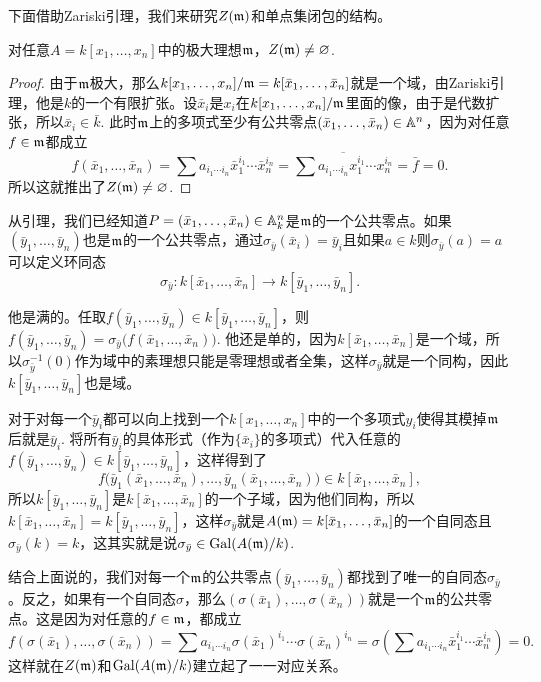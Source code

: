 下面借助Zariski引理，我们来研究$Z(\mathfrak{m})$和单点集闭包的结构。

\begin{lem}
    对任意$A=k[x_1,\dots,x_n]$中的极大理想$\mathfrak{m}$，$Z(\mathfrak{m})\neq\varnothing$.
\end{lem}

\begin{proof} 由于$\mathfrak{m}$极大，那么$k[x_1,\dots,x_n]/\mathfrak{m}=k[\bar{x}_1,\dots,\bar{x}_n]$就是一个域，由Zariski引理，他是$k$的一个有限扩张。设$\bar{x}_i$是$x_i$在$k[x_1,\dots,x_n]/\mathfrak{m}$里面的像，由于是代数扩张，所以$\bar{x}_i\in \bar{k}$. 此时$\mathfrak{m}$上的多项式至少有公共零点$(\bar{x}_1,\dots,\bar{x}_n)\in \mathbb{A}^n$，因为对任意$f\in \mathfrak{m}$都成立
    \[
        f(\bar{x}_1,\dots,\bar{x}_n)=\sum a_{i_1\cdots i_n} {\bar{x}}_1^{i_1}\cdots {\bar{x}}_n^{i_n}=\overline{\sum a_{i_1\cdots i_n} x_1^{i_1}\cdots x_n^{i_n}}=\bar{f}=0.
    \]
    所以这就推出了$Z(\mathfrak{m})\neq\varnothing$.\end{proof}

从引理，我们已经知道$P=(\bar{x}_1,\dots,\bar{x}_n)\in \mathbb{A}^n_k$是$\mathfrak{m}$的一个公共零点。如果$(\bar{y}_1,\dots,\bar{y}_n)$也是$\mathfrak{m}$的一个公共零点，通过$\sigma_{\bar{y}}(\bar{x}_i)=\bar{y}_i$且如果$a\in k$则$\sigma_{\bar{y}}(a)=a$可以定义环同态
\[
    \sigma_{\bar{y}}:k[\bar{x}_1,\dots,\bar{x}_n]\to k[\bar{y}_1,\dots,\bar{y}_n].
\]

他是满的。任取$f(\bar{y}_1,\dots,\bar{y}_n)\in k[\bar{y}_1,\dots,\bar{y}_n]$，则$f(\bar{y}_1,\dots,\bar{y}_n)=\sigma_{\bar{y}}\bigl(f(\bar{x}_1,\dots,\bar{x}_n)\bigr)$.
他还是单的，因为$k[\bar{x}_1,\dots,\bar{x}_n]$是一个域，所以$\sigma_{\bar{y}}^{-1}(0)$作为域中的素理想只能是零理想或者全集，这样$\sigma_{\bar{y}}$就是一个同构，因此$k[\bar{y}_1,\dots,\bar{y}_n]$也是域。

对于对每一个$\bar{y}_i$都可以向上找到一个$k[x_1,\dots,x_n]$中的一个多项式$y_i$使得其模掉$\mathfrak{m}$后就是$\bar{y}_i$.
将所有$\bar{y}_i$的具体形式（作为$\{\bar{x}_i\}$的多项式）代入任意的$f(\bar{y}_1,\dots,\bar{y}_n) \in k[\bar{y}_1,\dots,\bar{y}_n]$，这样得到了
\[
    f\bigl(\bar{y}_1(\bar{x}_1,\dots,\bar{x}_n),\dots,\bar{y}_n(\bar{x}_1,\dots,\bar{x}_n)\bigr) \in k[\bar{x}_1,\dots,\bar{x}_n],
\]
所以$k[\bar{y}_1,\dots,\bar{y}_n]$是$k[\bar{x}_1,\dots,\bar{x}_n]$的一个子域，因为他们同构，所以$k[\bar{x}_1,\dots,\bar{x}_n]=k[\bar{y}_1,\dots,\bar{y}_n]$，这样$\sigma_{\bar{y}}$就是$A(\mathfrak{m})=k[\bar{x}_1,\dots,\bar{x}_n]$的一个自同态且$\sigma_{\bar{y}}(k)=k$，这其实就是说$\sigma_{\bar{y}}\in \operatorname{Gal}(A(\mathfrak{m})/k)$.

结合上面说的，我们对每一个$\mathfrak{m}$的公共零点$(\bar{y}_1,\dots,\bar{y}_n)$都找到了唯一的自同态$\sigma_{\bar{y}}$。反之，如果有一个自同态$\sigma$，那么$(\sigma(\bar{x}_1),\dots,\sigma(\bar{x}_n))$就是一个$\mathfrak{m}$的公共零点。这是因为对任意的$f\in\mathfrak{m}$，都成立
\[
    f(\sigma(\bar{x}_1),\dots,\sigma(\bar{x}_n))=\sum a_{i_1\cdots i_n} \sigma({\bar{x}}_1)^{i_1}\cdots \sigma({\bar{x}}_n)^{i_n}=\sigma\left(\sum a_{i_1\cdots i_n} \bar{x}_1^{i_1}\cdots \bar{x}_n^{i_n}\right)=0.
\]
这样就在$Z(\mathfrak{m})$和$\operatorname{Gal}(A(\mathfrak{m})/k)$建立起了一一对应关系。

